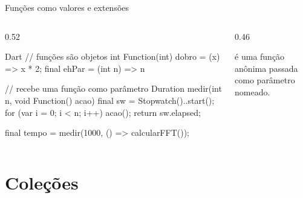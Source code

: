 \documentclass[aspectratio=169,10pt]{beamer}
\begin{document}
\begin{frame}[fragile]{Funções como valores e extensões}
  \begin{columns}[T]
    \begin{column}{0.52\textwidth}
\begin{codigo}[title=Funções anônimas]{Dart}
// funções são objetos
int Function(int) dobro = (x) => x * 2;
final ehPar = (int n) => n %

// recebe uma função como parâmetro
Duration medir(int n, void Function() acao) {
  final sw = Stopwatch()..start();
  for (var i = 0; i < n; i++) acao();
  return sw.elapsed;
}

final tempo = medir(1000, () => calcularFFT());
\end{codigo}
    \end{column}
    \begin{column}{0.46\textwidth}
      \begin{atencao}
         é uma função anônima passada como parâmetro nomeado.
      \end{atencao}
    \end{column}
  \end{columns}
\end{frame}

\section{Coleções}
\end{document}
